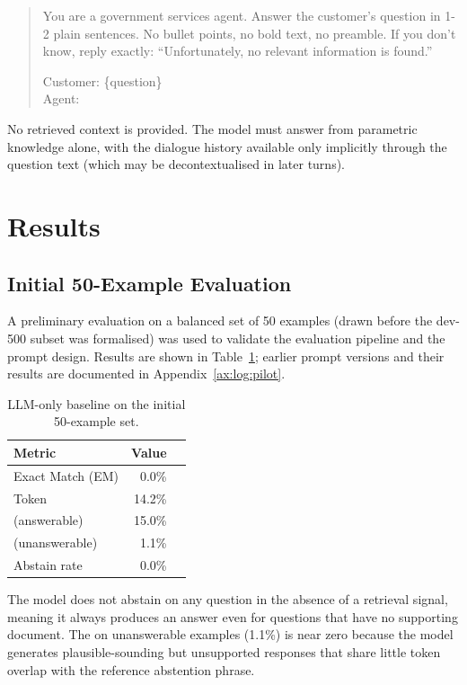 \begin{quote}
\small\ttfamily
You are a government services agent. Answer the customer's question in 1-2 plain
sentences. No bullet points, no bold text, no preamble. If you don't know, reply
exactly: ``Unfortunately, no relevant information is found.''

Customer: \{question\}\\
Agent:
\end{quote}

No retrieved context is provided. The model must answer from parametric knowledge
alone, with the dialogue history available only implicitly through the question text
(which may be decontextualised in later turns).


\section{Results}

\subsection{Initial 50-Example Evaluation}

A preliminary evaluation on a balanced set of 50 examples (drawn before the dev-500
subset was formalised) was used to validate the evaluation pipeline and the prompt
design. Results are shown in Table~\ref{tab:llm:initial}; earlier prompt versions and
their results are documented in Appendix~\ref{ax:log:pilot}.

\begin{table}[ht]
    \centering
    \caption{LLM-only baseline on the initial 50-example set.}
    \label{tab:llm:initial}
    \begin{tabular}{lrr}
        \toprule
        Metric & Value \\
        \midrule
        Exact Match (EM)    & 0.0\% \\
        Token \fone{}        & 14.2\% \\
        \fone{} (answerable) & 15.0\% \\
        \fone{} (unanswerable) & 1.1\% \\
        Abstain rate         & 0.0\% \\
        \bottomrule
    \end{tabular}
\end{table}

The model does not abstain on any question in the absence of a retrieval signal,
meaning it always produces an answer even for questions that have no supporting
document. The \fone{} on unanswerable examples (1.1\%) is near zero because the
model generates plausible-sounding but unsupported responses that share little
token overlap with the reference abstention phrase.

